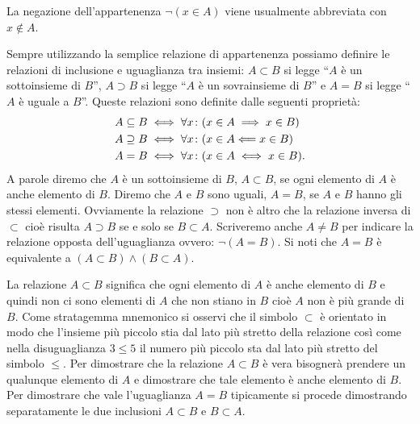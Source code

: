 La negazione dell'appartenenza $\lnot (x \in A)$ viene usualmente
abbreviata con $x \not \in A$.

Sempre utilizzando la semplice relazione di appartenenza possiamo definire
le relazioni di inclusione e uguaglianza tra insiemi:
$A \subset B$ si legge ``$A$ è un sottoinsieme di $B$'',
$A \supset B$ si legge ``$A$ è un sovrainsieme di $B$''
e $A=B$ si legge ``$A$ è uguale a $B$''. 
Queste relazioni sono definite dalle seguenti proprietà:
\begin{align*}
  A \subseteq B &\iff \forall x\colon (x\in A \implies x\in B)\\
  A \supseteq B &\iff \forall x\colon (x\in A \Longleftarrow x\in B)\\
  A = B &\iff \forall x\colon (x\in A \iff x \in B).
\end{align*}
A parole diremo che $A$ è un sottoinsieme di $B$, 
$A \subset B$, se ogni elemento di $A$ è anche elemento di $B$.
Diremo che $A$ e $B$ sono uguali, $A=B$, 
se $A$ e $B$ hanno gli stessi elementi.
Ovviamente la relazione $\supset$ non è altro 
che la relazione inversa di $\subset$ cioè risulta 
$A\supset B$ se e solo se $B\subset A$.
Scriveremo anche $A \neq B$ per indicare
la relazione opposta dell'uguaglianza ovvero: $\lnot(A=B)$.
Si noti che $A=B$ è equivalente a $(A\subset B) \land (B\subset A)$.

% 

La relazione $A \subset B$ significa che ogni elemento di $A$ 
è anche elemento di $B$ e quindi non ci sono elementi di $A$ che non stiano 
in $B$ cioè $A$ non è più grande di $B$. 
Come stratagemma mnemonico si osservi che il simbolo 
$\subset$ è orientato in modo che l'insieme più piccolo 
stia dal lato più stretto della relazione così come 
nella disuguaglianza $3 \le 5$ il numero più piccolo 
sta dal lato più stretto del simbolo $\le$.
Per dimostrare che la relazione $A \subset B$ è vera 
bisognerà prendere un qualunque elemento di $A$ e dimostrare 
che tale elemento è anche elemento di $B$.
Per dimostrare che vale l'uguaglianza $A=B$ tipicamente si procede 
dimostrando separatamente le due inclusioni $A\subset B$ e $B\subset A$.

